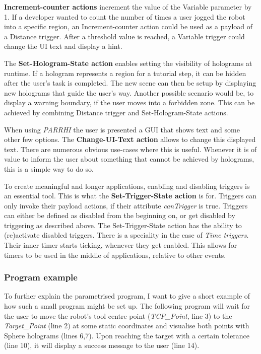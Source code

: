 \textbf{Increment-counter actions} increment the value of the Variable parameter by 1. If a developer wanted to count the number of times a user jogged the robot into a specific region, an Increment-counter action could be used as a payload of a Distance trigger. After a threshold value is reached, a Variable trigger could change the UI text and display a hint.

The \textbf{Set-Hologram-State action} enables setting the visibility of holograms at runtime. If a hologram represents a region for a tutorial step, it can be hidden after the user's task is completed. The new scene can then be setup by displaying new holograms that guide the user's way. Another possible scenario would be, to display a warning boundary, if the user moves into a forbidden zone. This can be achieved by combining Distance trigger and Set-Hologram-State actions.

When using \textit{PARRHI} the user is presented a GUI that shows text and some other few options. The \textbf{Change-UI-Text action} allows to change this displayed text. There are numerous obvious use-cases where this is useful. Whenever it is of value to inform the user about something that cannot be achieved by holograms, this is a simple way to do so.

To create meaningful and longer applications, enabling and disabling triggers is an essential tool. This is what the \textbf{Set-Trigger-State action} is for. Triggers can only invoke their payload actions, if their attribute \textit{canTrigger} is true. Triggers can either be defined as disabled from the beginning on, or get disabled by triggering as described above. The Set-Trigger-State action has the ability to (re)activate disabled triggers. There is a speciality in the case of \textit{Time triggers}. Their inner timer starts ticking, whenever they get enabled. This allows for timers to be used in the middle of applications, relative to other events.

\subsubsection{Program example}
To further explain the parametrised program, I want to give a short example of how such a small program might be set up. The following program will wait for the user to move the robot's tool centre point (\textit{TCP\_Point}, line 3) to the \textit{Target\_Point} (line 2) at some static coordinates and visualise both points with Sphere holograms (lines 6,7). Upon reaching the target with a certain tolerance (line 10), it will display a success message to the user (line 14).

